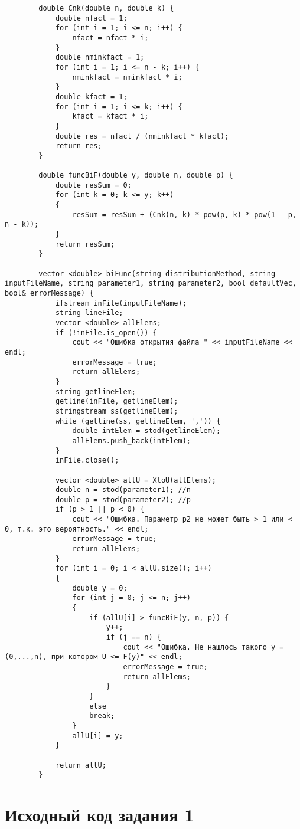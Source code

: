 \documentclass[bachelor, och, coursework]{shiza}
\begin{document}
	\begin{verbatim}
		double Cnk(double n, double k) {
			double nfact = 1;
			for (int i = 1; i <= n; i++) {
				nfact = nfact * i;
			}
			double nminkfact = 1;
			for (int i = 1; i <= n - k; i++) {
				nminkfact = nminkfact * i;
			}
			double kfact = 1;
			for (int i = 1; i <= k; i++) {
				kfact = kfact * i;
			}
			double res = nfact / (nminkfact * kfact);
			return res;
		}
		
		double funcBiF(double y, double n, double p) {
			double resSum = 0;
			for (int k = 0; k <= y; k++)
			{
				resSum = resSum + (Cnk(n, k) * pow(p, k) * pow(1 - p, n - k));
			}
			return resSum;
		}
		
		vector <double> biFunc(string distributionMethod, string inputFileName, string parameter1, string parameter2, bool defaultVec, bool& errorMessage) {
			ifstream inFile(inputFileName);
			string lineFile;
			vector <double> allElems;
			if (!inFile.is_open()) {
				cout << "Ошибка открытия файла " << inputFileName << endl;
				errorMessage = true;
				return allElems;
			}
			string getlineElem;
			getline(inFile, getlineElem);
			stringstream ss(getlineElem);
			while (getline(ss, getlineElem, ',')) {
				double intElem = stod(getlineElem);
				allElems.push_back(intElem);
			}
			inFile.close();
			
			vector <double> allU = XtoU(allElems);
			double n = stod(parameter1); //n
			double p = stod(parameter2); //p
			if (p > 1 || p < 0) {
				cout << "Ошибка. Параметр p2 не может быть > 1 или < 0, т.к. это вероятность." << endl;
				errorMessage = true;
				return allElems;
			}
			for (int i = 0; i < allU.size(); i++)
			{
				double y = 0;
				for (int j = 0; j <= n; j++)
				{
					if (allU[i] > funcBiF(y, n, p)) {
						y++;
						if (j == n) {
							cout << "Ошибка. Не нашлось такого y = (0,...,n), при котором U <= F(y)" << endl;
							errorMessage = true;
							return allElems;
						}
					}
					else
					break;
				}
				allU[i] = y;
			}
			
			return allU;
		}
	\end{verbatim}


	\newpage
	\appendix
	\section{Исходный код задания 1}
	
\end{document}
